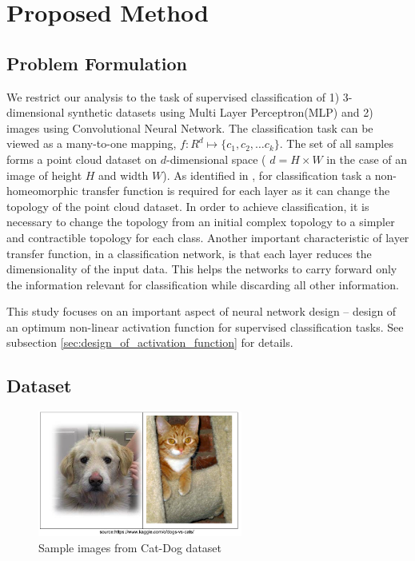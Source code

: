 \documentclass[wcp]{jmlr}
\begin{document}
\section{Proposed Method}
\subsection{Problem Formulation}
We restrict our analysis to the task of supervised classification of  1) 3-dimensional synthetic datasets using Multi Layer Perceptron(MLP) and 2) images using Convolutional Neural Network. The classification task can be viewed as a many-to-one mapping, $f:R^d \mapsto \{c_1, c_2, \ldots c_k\}$. The set of all samples forms a point cloud dataset on $d$-dimensional space ( $d=H \times W $  in the case of an image of height $H$ and width $W$). As identified in \cite{naitzat2020topology}, for classification task a non-homeomorphic transfer function is required for each layer as it can change the topology of the point cloud dataset. In order to achieve classification, it is necessary to change the topology from an initial complex topology to a simpler and contractible topology for each class. Another important characteristic of layer transfer function, in a classification network, is that each layer reduces the dimensionality of the input data. This helps the networks to carry forward only the information relevant for classification while discarding all other information.

This study focuses on an important aspect of neural network design -- design of an optimum non-linear activation function for supervised classification tasks. See subsection \ref{sec:design_of_activation_function} for details.

\subsection{Dataset}

\begin{figure}[h]
\begin{center}
\includegraphics[width=0.6\textwidth]{images/catdog.png}
\caption{Sample images from Cat-Dog dataset}\label{fig:catdog}
\end{center}
\end{figure}
\end{document}
